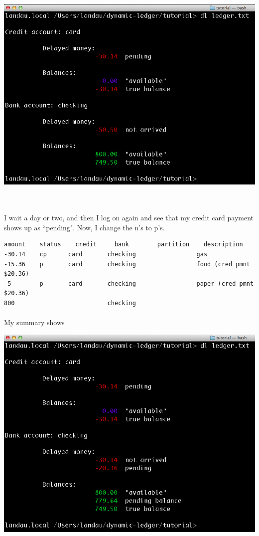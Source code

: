 \documentclass{article}
\providecommand{\q}{$\quad$ \newline}
\begin{document}
\begin{flushleft}
\begin{center}
\includegraphics[scale=.45]{fig/sum5.png}
\end{center} \q

\paragraph{} I wait a day or two, and then I log on again and see that my credit card payment shows up as ``pending". Now, I change the n's to p's.

\begin{lstlisting}[title=ledger.txt]
amount    status	credit     bank        partition    description
-30.14    cp      card       checking                 gas
-15.36    p       card       checking                 food (cred pmnt $20.36)
-5        p       card       checking                 paper (cred pmnt $20.36)
800                          checking
\end{lstlisting}

\paragraph{} My summary shows

\begin{center}
\includegraphics[scale=.45]{fig/sum6.png}
\end{center} \q


\end{flushleft}
\end{document}
